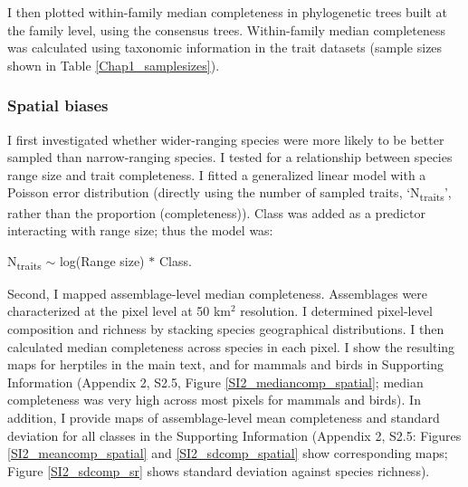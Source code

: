 I then plotted within-family median completeness in phylogenetic trees built at the family level, using the consensus trees. Within-family median completeness was calculated using taxonomic information in the trait datasets (sample sizes shown in Table \ref{Chap1_samplesizes}).

\subsubsection{Spatial biases}

I first investigated whether wider-ranging species were more likely to be better sampled than narrow-ranging species. I tested for a relationship between species range size and trait completeness. I fitted a generalized linear model with a Poisson error distribution (directly using the number of sampled traits, `N\textsubscript{traits}', rather than the proportion (completeness)). Class was added as a predictor interacting with range size; thus the model was:
\begin{center}
N\textsubscript{traits} $\sim$ log(Range size) $\ast$ Class. 
\end{center}
Second, I mapped assemblage-level median completeness. Assemblages were characterized at the pixel level at 50 km$^2$ resolution. I determined pixel-level composition and richness by stacking species geographical distributions. I then calculated median completeness across species in each pixel. I show the resulting maps for herptiles in the main text, and for mammals and birds in Supporting Information (Appendix 2, S2.5, Figure \ref{SI2_mediancomp_spatial}; median completeness was very high across most pixels for mammals and birds). In addition, I provide maps of assemblage-level mean completeness and standard deviation for all classes in the Supporting Information (Appendix 2, S2.5: Figures \ref{SI2_meancomp_spatial} and \ref{SI2_sdcomp_spatial} show corresponding maps; Figure \ref{SI2_sdcomp_sr} shows standard deviation against species richness).

